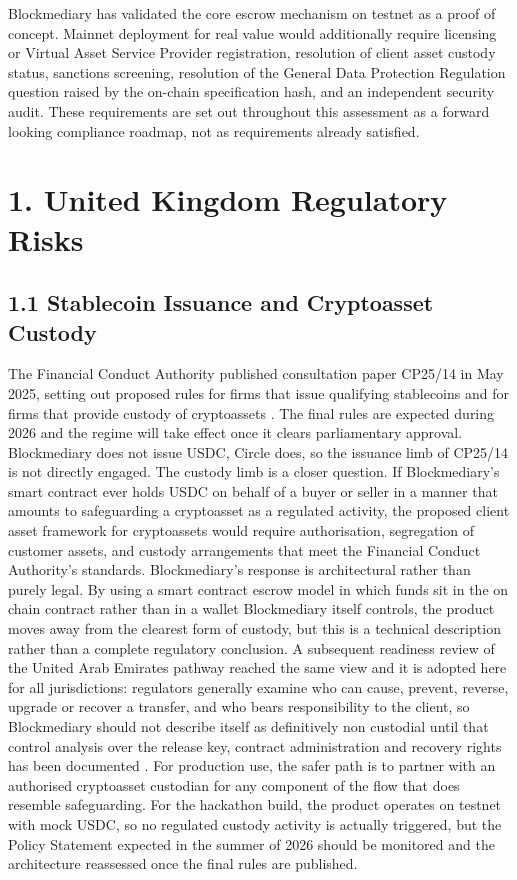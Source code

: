 \documentclass[12pt, a4paper]{article}
\begin{document}
Blockmediary has validated the core escrow mechanism on testnet as a proof of concept.
Mainnet deployment for real value would additionally require licensing or Virtual Asset
Service Provider registration, resolution of client asset custody status, sanctions
screening, resolution of the General Data Protection Regulation question raised by the
on-chain specification hash, and an independent security audit. These requirements are set
out throughout this assessment as a forward looking compliance roadmap, not as requirements
already satisfied.

\section*{1. United Kingdom Regulatory Risks}

\subsection*{1.1 Stablecoin Issuance and Cryptoasset Custody}

The Financial Conduct Authority published consultation paper CP25/14 in May 2025, setting
out proposed rules for firms that issue qualifying stablecoins and for firms that provide
custody of cryptoassets \citep{fcacp2514}. The final rules are expected during 2026 and the
regime will take effect once it clears parliamentary approval. Blockmediary does not issue
USDC, Circle does, so the issuance limb of CP25/14 is not directly engaged. The custody
limb is a closer question. If Blockmediary's smart contract ever holds USDC on behalf of a
buyer or seller in a manner that amounts to safeguarding a cryptoasset as a regulated
activity, the proposed client asset framework for cryptoassets would require authorisation,
segregation of customer assets, and custody arrangements that meet the Financial Conduct
Authority's standards. Blockmediary's response is architectural rather than purely legal.
By using a smart contract escrow model in which funds sit in the on chain contract rather
than in a wallet Blockmediary itself controls, the product moves away from the clearest
form of custody, but this is a technical description rather than a complete regulatory
conclusion. A subsequent readiness review of the United Arab Emirates pathway reached the
same view and it is adopted here for all jurisdictions: regulators generally examine who
can cause, prevent, reverse, upgrade or recover a transfer, and who bears responsibility to
the client, so Blockmediary should not describe itself as definitively non custodial until
that control analysis over the release key, contract administration and recovery rights has
been documented \citep{difcvarareport2026}. For production use, the safer path is to
partner with an authorised cryptoasset custodian for any component of the flow that does
resemble safeguarding. For the hackathon build, the product operates on testnet with mock
USDC, so no regulated custody activity is actually triggered, but the Policy Statement
expected in the summer of 2026 should be monitored and the architecture reassessed once the
final rules are published.
\end{document}
